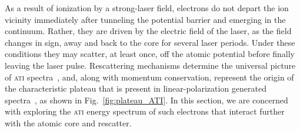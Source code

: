 As a result of ionization by a strong-laser field, electrons do not
depart the ion vicinity immediately after tunneling the potential
barrier and emerging in the continuum. Rather, they are driven by the
electric field of the laser, as the field changes in sign, away and
back to the core for several laser periods. Under these conditions
they may scatter, at least once, off the atomic potential before
finally leaving the laser pulse. Rescattering mechanisms determine the
universal picture of \textsc{ati}
spectra~\cite{Becker_rescattering1994,Walker_1996,BeckerRescattering_2018},
and, along with momentum conservation, represent the origin of the
characteristic plateau that is present in linear-polarization
generated spectra~\cite{Paulus_1994plateau}, as shown in
Fig.~\ref{fig:plateau_ATI}. In this section, we are concerned with
exploring the \textsc{ati} energy spectrum of such electrons that
interact further with the atomic core and rescatter.


